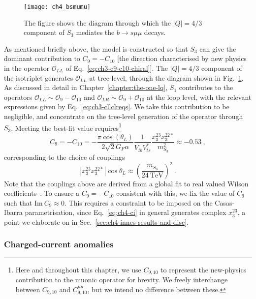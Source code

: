 \begin{figure}[t]
  \centering
  \texttt{[image: ch4\_bsmumu]}
  \caption{The figure shows the diagram through which the $|Q| = 4/3$ component
    of $S_{3}$ mediates the $b \to s \mu\mu$ decays.}
  \label{fig:ch4-s3-bsmumu}
\end{figure}

As mentioned briefly above, the model is constructed so that $S_{3}$ can give
the dominant contribution to $C_{9} = -C_{10}$ [the direction characterised by
new physics in the operator $\mathcal{O}_{LL}$ of
Eq.~\eqref{eq:ch3-c9-c10-chiral}]. The $|Q| = 4/3$ component of the isotriplet
generates $\mathcal{O}_{LL}$ at tree-level, through the diagram shown in
Fig.~\ref{fig:ch4-s3-bsmumu}. As discussed in detail in
Chapter~\ref{chapter:the-one-lq}, $S_{1}$ contributes to the operators
$\mathcal{O}_{LL} \sim \mathcal{O}_{9} - \mathcal{O}_{10}$ and
$\mathcal{O}_{LR} \sim \mathcal{O}_{9} + \mathcal{O}_{10}$ at the loop level,
with the relevant expressions given by Eq.~\eqref{eq:ch3-cllclreqs}. We take
this contribution to be negligible, and concentrate on the tree-level generation
of the operator through $S_{3}$. Meeting the best-fit value
requires\footnote{Here and throughout this chapter, we use $C_{9,10}$ to
  represent the new-physics contribution to the muonic operator for brevity. We
  freely interchange between $C_{9,10}$ and $C_{9,10}^{\mu\mu}$, but we intend
  no difference between these.}
\begin{equation}
  \label{eq:ch4-c9c10}
  {C}_9= -{C}_{10} = - \frac{\pi \cos (\theta_L)}{2 \sqrt{2} G_F \alpha} \frac{1}{V_{tb}V_{ts}^*} \frac{x_{3}^{23} x_{3}^{22*}}{m_{S_{3}}^2} \approx -0.53 \ ,
\end{equation}
corresponding to the choice of couplings
\begin{equation}
 |x_{3}^{23} x^{22*}_{3} | \cos \theta_L \approx  \left(\frac{m_{S_{3}}}{\SI{24}{\TeV}} \right)^2 \ .
\end{equation}
Note that the couplings above are derived from a global fit to real valued
Wilson coefficients~\cite{Aebischer:2019mlg}. To ensure a ${C}_9=-{C}_{10}$
consistent with this, we fix the value of $C_9$ such that
$\text{Im}~C_9 \approx 0$. This requires a constraint to be imposed on the
Casas-Ibarra parametrisation, since Eq.~\eqref{eq:ch4-ci} in general generates
complex $x_{3}^{23}$, a point we elaborate on in
Sec.~\ref{sec:ch4-innes-results-and-disc}.

\subsubsection{Charged-current anomalies}

